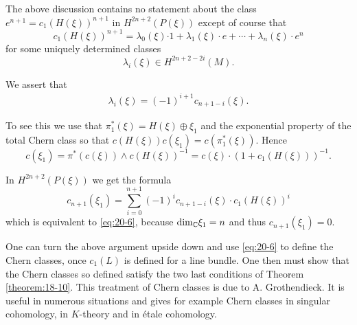 The above discussion contains no statement about the class ${e}^{n + 1} = {c}_{1}{( H( \xi ) ) }^{n + 1}$ in $H^{{2n} + 2}( {P( \xi ) })$ 
except of course that
\[
  {c}_{1}{( H( \xi ) ) }^{n + 1} 
  = {\lambda }_{0}( \xi ) {\cdot 1} 
    + {\lambda }_{1}( \xi )\cdot e 
    + \cdots  
    + {\lambda }_{n}( \xi )\cdot {e}^{n}
\]
for some uniquely determined classes
\[
  {\lambda }_{i}( \xi )  \in  H^{{2n} + 2- {2i}}( M).
\]

We assert that
\begin{align}\label{eq:20-6}
  {\lambda }_{i}( \xi )  = {(-1) }^{i + 1}{c}_{n + 1- i}( \xi ).
\end{align}

To see this we use that ${\pi }_{1}^*( \xi )  = H( \xi )  \oplus  {\xi }_{1}$ and the exponential 
property of the total Chern class so that $c( {H( \xi ) }) c( {\xi }_{1})  = c( {{\pi }_{1}^*( \xi ) })$. 
Hence
\[
  c( {\xi }_{1})  
  = {\pi }^*( {c( \xi ) })  \land  c{( H( \xi ) ) }^{-1} 
  = c( \xi )  \cdot  {( 1 + {c}_{1}( H( \xi ) ) ) }^{-1}.
\]

In $H^{{2n} + 2}( {P( \xi ) })$ we get the formula
\[
  {c}_{n + 1}( {\xi }_{1})  
  = \sum_{i = 0}^{{n + 1}}{(-1) }^{i}{c}_{n + 1- i}( \xi )  \cdot  {c}_{1}{( H( \xi ) ) }^{i}
\]
which is equivalent to \eqref{eq:20-6}, because ${\dim }_{\mathbb{C}}{\xi }_{1} = n$ and thus ${c}_{n + 1}( {\xi }_{1})  = 0$.

\begin{remark}\label{remark:20-3}
  One can turn the above argument upside down and use \eqref{eq:20-6} to define the Chern classes, 
  once ${c}_{1}( L)$ is defined for a line bundle. One then must show that the Chern classes 
  so defined satisfy the two last conditions of Theorem \ref{theorem:18-10}. This treatment of Chern classes is 
  due to A. Grothendieck. It is useful in numerous situations and gives for example Chern classes 
  in singular cohomology, in $K$-theory and in \'etale cohomology.  
\end{remark}

